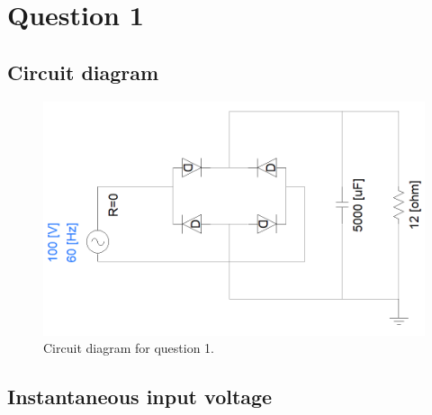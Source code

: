 \section{Question 1}
\subsection{Circuit diagram}
\begin{figure}[H]
    \centering
    \includegraphics[width = \textwidth]{img/figure1.png}
    \caption{Circuit diagram for question 1.}
\end{figure}
\subsection{Instantaneous input voltage}